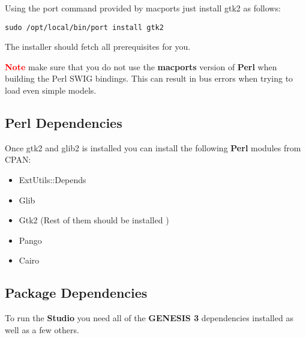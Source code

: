 \documentclass[12pt]{article}
\begin{document}
Using the port command provided by macports just install gtk2 as follows:

\begin{verbatim}
sudo /opt/local/bin/port install gtk2
\end{verbatim}

The installer should fetch all prerequisites for you.

\textcolor{red}{\bf Note} make sure that you do not use the {\bf macports} version of {\bf Perl} when building the Perl SWIG bindings. This can result in bus errors when trying to load even simple models.



\subsection*{Perl Dependencies}

Once gtk2 and glib2 is installed you can install the following {\bf Perl} modules from CPAN:

\begin{itemize}
\item[] ExtUtils::Depends
\item[] Glib
\item[] Gtk2 (Rest of them should be installed )
\item[] Pango
\item[] Cairo
\end{itemize}

\subsection*{Package Dependencies}

To run the {\bf Studio} you need all of the {\bf GENESIS 3} dependencies installed as well as a few others.
\end{document}
